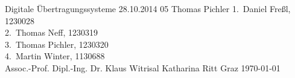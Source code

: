 \TUHeader                          %
{Digitale Übertragungssysteme}                       %
{28.10.2014}                        %
{05}                            %
{Thomas Pichler}                   %
{
1.~Daniel Freßl, 1230028\\
2.~Thomas Neff, 1230319\\                    %
3.~Thomas Pichler, 1230320 \\                   %
4.~Martin Winter, 1130688\\
}
{Assoc.-Prof. Dipl.-Ing. Dr. Klaus Witrisal}
{Katharina Ritt}                          %
{Graz}                              %
{\today}                            %




\pagebreak
  
\tableofcontents
  
\pagebreak